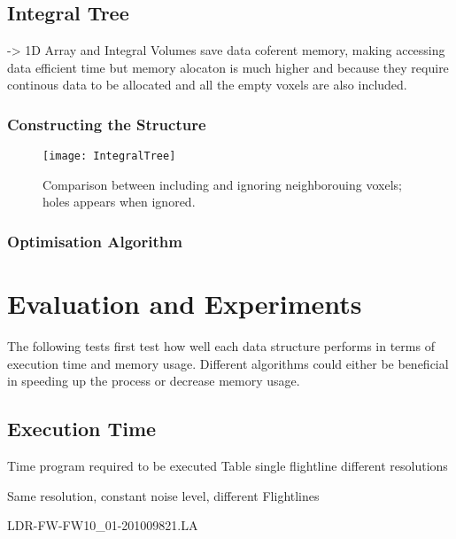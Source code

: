 \documentclass{subfiles}
\begin{document}
\subsection{Integral Tree}\label{sec:ITopt}
-> 1D Array and Integral Volumes save data coferent memory, making accessing data efficient time but memory alocaton is much higher and because they require continous data to be allocated and all the empty voxels are also included. 

\subsubsection{Constructing the Structure}

\begin{figure}[!htbp]
	\centering
	\texttt{[image: IntegralTree]}
	\caption{Comparison between including and ignoring neighborouing voxels; holes appears when ignored.}
	\label{fig:IntegralTreeQuads}
\end{figure}

\subsubsection{Optimisation Algorithm}






\section{Evaluation and Experiments}


The following tests first test how well each data structure performs in terms of execution time and memory usage. 
Different algorithms could either be beneficial in speeding up the process or decrease memory usage. 

\subsection{Execution Time}
Time program required to be executed
Table single flightline different resolutions



Same resolution, constant noise level, different Flightlines



LDR-FW-FW10\_01-201009821.LA
\end{document}
